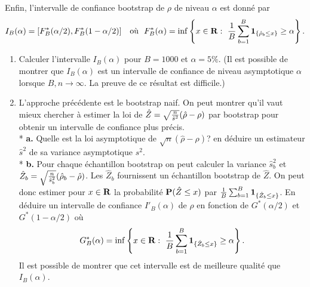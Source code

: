 \documentclass{article}
\begin{document}
Enfin, l'intervalle de confiance bootstrap de $\rho$ de niveau $\alpha$ est donn\'e par 
$$I_{B}(\alpha)=[F^{*}_{B}(\alpha/2),F^{*}_{B}(1-\alpha/2)]\quad \textrm{o\`u} \ \ F^*_{B}(\alpha)=\inf\left\{x\in{\bf R}: \ {1\over B}\sum_{b=1}^{B}{\bf 1}_{\{\hat\rho_{b}\leq x\}}\geq \alpha\right\}.$$
\begin{enumerate}
\item Calculer l'intervalle $I_{B}(\alpha)$ pour $B=1000$ et $\alpha=5\%$.
(Il est possible de montrer que $I_{B}(\alpha)$ est un intervalle de confiance de niveau asymptotique $\alpha$ lorsque $B,n\to\infty$.
La preuve de ce r\'esultat est difficile.)
\item %
L'approche pr\'ec\'edente est le bootstrap naif. On peut montrer qu'il vaut mieux chercher \`a estimer la loi de $\hat Z=\sqrt{n\over \hat s^2}(\hat \rho-\rho)$ par bootstrap pour obtenir un intervalle de confiance plus pr\'ecis. \\*
{\bf a.} Quelle est la loi asymptotique de $\sqrt{n}(\hat \rho-\rho)$? en d\'eduire un estimateur $\hat s^2$ de sa variance asymptotique $s^2$. \\*
{\bf b.} Pour chaque \'echantillon bootstrap on peut calculer la variance $\hat s_{b}^2$ et $\hat Z_{b}=\sqrt{n\over \hat s^2_{b}}(\hat \rho_{b}-\hat\rho)$. Les $\hat Z_{b}$ fournissent un \'echantillon bootstrap de $\hat Z$. On peut donc estimer pour $x\in {\bf R}$ la probabilit\'e ${\bf P}(\hat Z \leq x)$ par ${1\over B}\sum_{b=1}^{B}{\bf 1}_{\{\hat Z_{b}\leq x\}}$. 
En d\'eduire un intervalle de confiance $I'_{B}(\alpha)$ de $\rho$ en fonction de $G^*(\alpha/2)$ et $G^*(1-\alpha/2)$ o\`u 
$$G^*_{B}(\alpha)=\inf\left\{x\in{\bf R}: \ {1\over B}\sum_{b=1}^{B}{\bf 1}_{\{\hat Z_{b}\leq x\}}\geq \alpha\right\}.$$
Il est possible de montrer que cet intervalle est de meilleure qualit\'e que $I_{B}(\alpha)$.
\end{enumerate}
\end{document}
